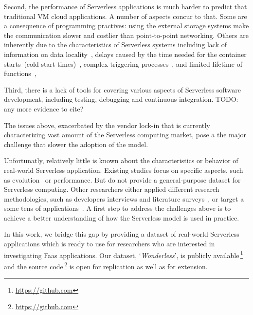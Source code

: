 Second, the performance of Serverless applications is much harder to 
predict that traditional VM cloud applications. A number of aspects concur to that.
Some are a consequence of programming practives:
using the external storage systems make the 
communication slower and costlier than point-to-point networking.
Others are inherently due to the characteristics of Serverless systems
including 
lack of information on data locality~\cite{DBLP:journals/corr/abs-1902-03383},
delays caused by the time needed 
for the container starts~(cold start times)~\cite{manner2018cold}, 
complex triggering processes~\cite{pelle2019towards}, and
limited lifetime of functions~\cite{hellerstein2018serverless}, 

Third, there is a lack of tools for covering various aspects of
Serverless software development, including testing, debugging 
and continuous integration. TODO: any more evidence to cite?
	
The issues above, exacerbated by the vendor lock-in that is currently 
characterizing vast amount of the Serverless computing market, 
pose a the major challenge that slower the adoption of the \faas model. 

Unfortunatly, relatively little is known about the characteristics 
or behavior of real-world Serverless application. Existing studies focus 
on specific aspects, such as evolution~\cite{spillner2019quantitative} 
or performance\cite{wang2018peeking,lloyd2018serverless}.
But do not provide a general-purpose dataset for Serverless computing.
Other researchers either applied different research methodologies, 
such as developers interviews and literature surveys~\cite{leitner2019mixed},
or target a some tens of applications~\cite{eismann2020serverless}.
A first step to address the challenges above is to achieve a 
better understanding of how the Serverless model is used in practice. 


In this work, we bridge this gap by providing a dataset of real-world Serverless 
applications which is ready to use for researchers who are interested in investigating
Faas applications. Our dataset, `\emph{Wonderless}', is publicly 
available\,\footnote{\url{https://github.com}} 
and the source code\,\footnote{\url{https://github.com}} 
is open for replication as well as for extension.











